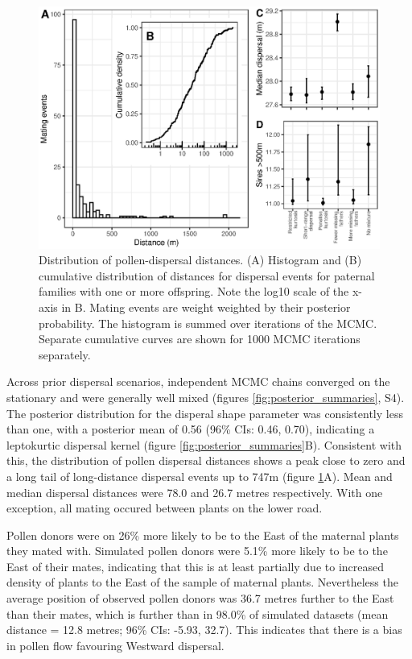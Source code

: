 \documentclass[10pt, a4paper, twocolumn]{article} %
\begin{document}
\begin{figure}
    \centering
    \includegraphics{dispersal.eps}
    \caption{
        Distribution of pollen-dispersal distances.
        (A) Histogram and (B) cumulative distribution of distances for dispersal events for paternal families with one or more offspring.
        Note the log10 scale of the x-axis in B.
        Mating events are weight weighted by their posterior probability.
        The histogram is summed over iterations of the MCMC.
        Separate cumulative curves are shown for 1000 MCMC iterations separately.
    }
    \label{fig:dispersal}
\end{figure}

Across prior dispersal scenarios, independent MCMC chains converged on the stationary and were generally well mixed (figures \ref{fig:posterior_summaries}, S4).
The posterior distribution for the disperal shape parameter was consistently less than one, with a posterior mean of 0.56 (96\% CIs: 0.46, 0.70), indicating a leptokurtic dispersal kernel (figure \ref{fig:posterior_summaries}B).
Consistent with this, the distribution of pollen dispersal distances shows a peak close to zero and a long tail of long-distance dispersal events up to 747m (figure \ref{fig:dispersal}A).
Mean and median dispersal distances were 78.0 and 26.7 metres respectively.
With one exception, all mating occured between plants on the lower road.

Pollen donors were on 26\% more likely to be to the East of the maternal plants they mated with.
Simulated pollen donors were 5.1\% more likely to be to the East of their mates, indicating that this is at least partially due to increased density of plants to the East of the sample of maternal plants.
Nevertheless the average position of observed pollen donors was 36.7 metres further to the East than their mates, which is further than in 98.0\% of simulated datasets (mean distance = 12.8 metres; 96\% CIs: -5.93, 32.7).
This indicates that there is a bias in pollen flow favouring Westward dispersal.
\end{document}
